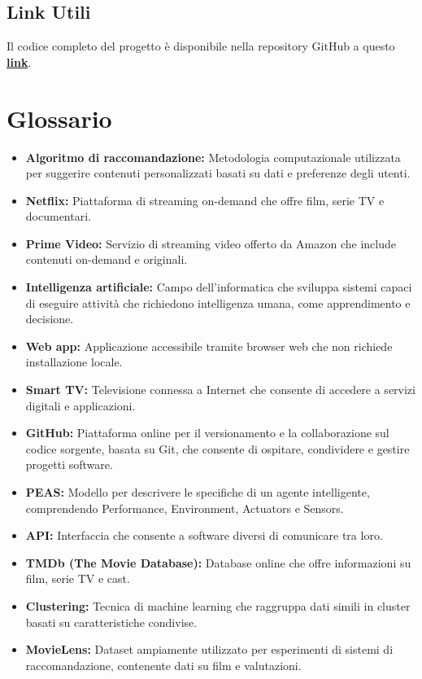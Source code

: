 \documentclass[a4paper,12pt]{article}
\begin{document}
	\subsection{Link Utili}
Il codice completo del progetto è disponibile nella repository GitHub a questo \textcolor{blue}{\href{https://github.com/LRuocco22/NozApp/}{\textbf{{link}}}}.

\section{Glossario}
\begin{itemize}
\item \textbf{Algoritmo di raccomandazione:} Metodologia computazionale utilizzata per suggerire contenuti personalizzati basati su dati e preferenze degli utenti.
\item \textbf{Netflix:} Piattaforma di streaming on-demand che offre film, serie TV e documentari.
\item \textbf{Prime Video:} Servizio di streaming video offerto da Amazon che include contenuti on-demand e originali.
\item \textbf{Intelligenza artificiale:} Campo dell'informatica che sviluppa sistemi capaci di eseguire attività che richiedono intelligenza umana, come apprendimento e decisione.
\item \textbf{Web app:} Applicazione accessibile tramite browser web che non richiede installazione locale.
\item \textbf{Smart TV:} Televisione connessa a Internet che consente di accedere a servizi digitali e applicazioni.
\item \textbf{GitHub:} Piattaforma online per il versionamento e la collaborazione sul codice sorgente, basata su Git, che consente di ospitare, condividere e gestire progetti software.
\item \textbf{PEAS:} Modello per descrivere le specifiche di un agente intelligente, comprendendo Performance, Environment, Actuators e Sensors.
\item \textbf{API:} Interfaccia che consente a software diversi di comunicare tra loro.
\item \textbf{TMDb (The Movie Database):} Database online che offre informazioni su film, serie TV e cast.
\item \textbf{Clustering:} Tecnica di machine learning che raggruppa dati simili in cluster basati su caratteristiche condivise.
\item \textbf{MovieLens:} Dataset ampiamente utilizzato per esperimenti di sistemi di raccomandazione, contenente dati su film e valutazioni.

\end{itemize}
\end{document}
